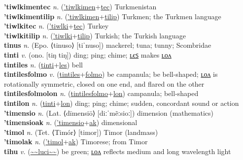 \textbf{'tiwlkimentec} \textit{n.} (\hyperref['tiwlkimen]{'tiwlkimen}+\hyperref[tec]{tec})
Turkmenistan \label{'tiwlkimentec} \\
\textbf{'tiwlkimentilip} \textit{n.} (\hyperref['tiwlkimen]{'tiwlkimen}+\hyperref[tilip]{tilip})
Turkmen; the Turkmen language \label{'tiwlkimentilip} \\
\textbf{'tiwlkitec} \textit{n.} (\hyperref['tiwlki]{'tiwlki}+\hyperref[tec]{tec})
Turkey \label{'tiwlkitec} \\
\textbf{'tiwlkitilip} \textit{n.} (\hyperref['tiwlki]{'tiwlki}+\hyperref[tilip]{tilip})
Turkish; the Turkish language \label{'tiwlkitilip} \\
\textbf{tinus} \textit{n.} (Epo. ⟨tinuso⟩ [tiˈnuso])
mackerel; tuna; tunny; Scombridae \label{tinus} \\
\textbf{tinti} \textit{v.} (ono. [tiŋ tiŋ])
ding; ping; chime; \hyperref[tintiles]{ʟєꜱ} makes \hyperref[tintilon]{ʟᴏᴧ} \label{tinti} \\
\textbf{tintiles} \textit{n.} (\hyperref[tinti]{tinti}+\hyperref[les]{les})
bell \label{tintiles} \\
\textbf{tintilesfolmo} \textit{v.} (\hyperref[tintiles]{tintiles}+\hyperref[folmo]{folmo})
be campanula; be bell-shaped; \hyperref[tintilesfolmolon]{ʟᴏᴧ} is rotationally symmetric, closed on one end, and flared on the other \label{tintilesfolmo} \\
\textbf{tintilesfolmolon} \textit{n.} (\hyperref[tintilesfolmo]{tintilesfolmo}+\hyperref[lon]{lon})
campanula; bell-shaped \label{tintilesfolmolon} \\
\textbf{tintilon} \textit{n.} (\hyperref[tinti]{tinti}+\hyperref[lon]{lon})
ding; ping; chime; sudden, concordant sound or action \label{tintilon} \\
\textbf{'timensio} \textit{n.} (Lat. ⟨dīmensiō⟩ [diːˈmẽːsioː])
dimension (mathematics) \label{'timensio} \\
\textbf{'timensioak} \textit{n.} (\hyperref['timensio]{'timensio}+\hyperref[ak]{ak})
dimensional \label{'timensioak} \\
\textbf{'timol} \textit{n.} (Tet. ⟨Timór⟩ [timor])
Timor (landmass) \label{'timol} \\
\textbf{'timolak} \textit{n.} (\hyperref['timol]{'timol}+\hyperref[ak]{ak})
Timorese; from Timor \label{'timolak} \\
\textbf{tihu} \textit{v.} (\hyperref[luci]{\~{}\~{}luci\~{}\~{}})
be green; \hyperref[tihulon]{ʟᴏᴧ} reflects medium and long wavelength light \label{tihu} \\
